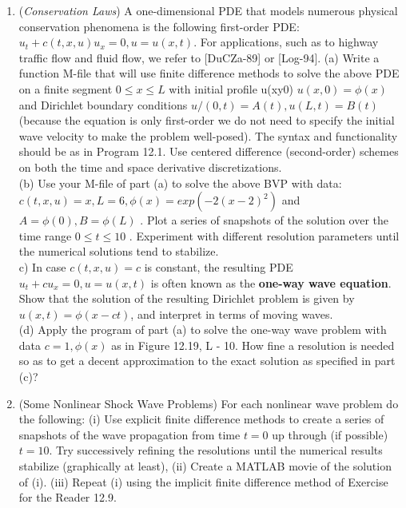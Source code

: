 \documentclass[../main.tex]{subfiles}
\begin{document}
{{\begin{enumerate}
\\ 
\texttt{[x, t, Ü] = onedimwavedirneu(phi, nu, L, A, B, T, N, M, c)}
\\
\\
(b) Use the program of part (a) to solve the BVP above with the following data: $c = 1, L = 5, \phi= v = B = 0$ , and A(t) as in Example 12.6. Display the solution as a series of snapshots. 
 \\
(c) Repeat part (b), but change c to be as in Example 12.6.. 
	\item
		(\textit{Conservation Laws}) A one-dimensional PDE that models numerous physical conservation phenomena is the following first-order PDE: $u_t + c(t,x,u)u_x = 0, u = u(x,t)$. For applications, such as to highway traffic flow and fluid flow, we refer to [DuCZa-89] or [Log-94]. (a) Write a function M-file that will use finite difference methods to solve the above PDE on a finite segment $0 \leqslant x \leqslant L$ with initial profile u(xy0) $u(x,0)= \phi(x)$ and Dirichlet boundary conditions $u/(0,t) = A(t),  u(L,t) = B(t)$ (because the equation is only first-order we do not need to specify the initial wave velocity to make the problem well-posed). The syntax and functionality should be as in Program 12.1. Use centered difference (second-order) schemes on both the time and space derivative discretizations. 
\\
(b) Use your M-file of part (a) to solve the above BVP with data: $c(t,x,u) =x, L = 6, \phi(x) = exp(-2(x- 2)^2)$ and $A = \phi(0), B = \phi(L)$ . Plot a series of snapshots of the solution over the time range $0 \leqslant t \leqslant 10$ . Experiment with different resolution parameters until the numerical solutions tend to stabilize. 
\\
c) In case $c(t,x,u) = c$ is constant, the resulting PDE $u_t +cu_x = 0, u = u(x,t)$ is often known 
as the \textbf{one-way wave equation}. Show that the solution of the resulting Dirichlet problem is 
given by $u(x,t) = \phi(x- ct)$, and interpret in terms of moving waves. 
\\
(d) Apply the program of part (a) to solve the one-way wave problem with data $c = 1, \phi(x)$ as in Figure 12.19, L - 10. How fine a resolution is needed so as to get a decent approximation to the exact solution as specified in part (c)? 
	\item
	(Some Nonlinear Shock Wave Problems) For each nonlinear wave problem do the following: (i) Use explicit finite difference methods to create a series of snapshots of the wave propagation from time $t = 0$ up through (if possible) $t = 10$. Try successively refining the resolutions until the numerical results stabilize (graphically at least), (ii) Create a MATLAB movie of the solution of (i). (iii) Repeat (i) using the implicit finite difference method of Exercise for the Reader 12.9. 

\end{enumerate}}}
\end{document}
